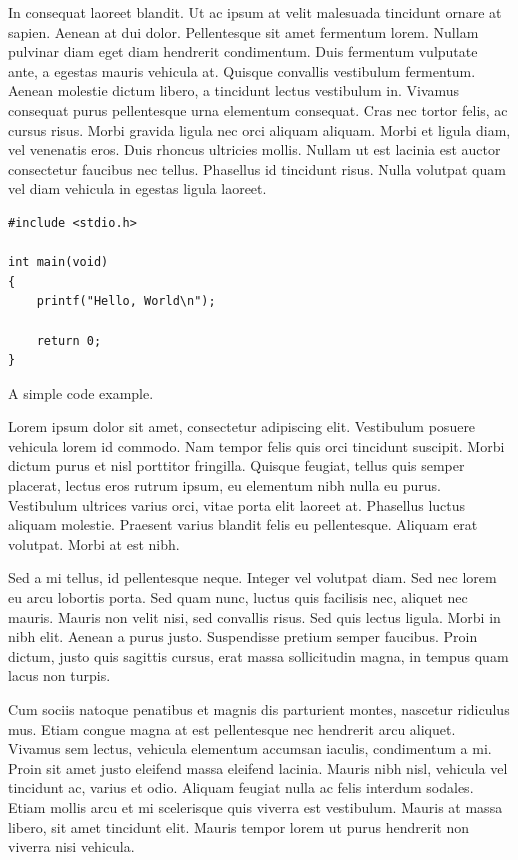 In consequat laoreet blandit. Ut ac ipsum at velit malesuada tincidunt ornare at sapien. Aenean at dui dolor. Pellentesque sit amet fermentum lorem. Nullam pulvinar diam eget diam hendrerit condimentum. Duis fermentum vulputate ante, a egestas mauris vehicula at. Quisque convallis vestibulum fermentum. Aenean molestie dictum libero, a tincidunt lectus vestibulum in. Vivamus consequat purus pellentesque urna elementum consequat. Cras nec tortor felis, ac cursus risus. Morbi gravida ligula nec orci aliquam aliquam. Morbi et ligula diam, vel venenatis eros. Duis rhoncus ultricies mollis. Nullam ut est lacinia est auctor consectetur faucibus nec tellus. Phasellus id tincidunt risus. Nulla volutpat quam vel diam vehicula in egestas ligula laoreet. 

\begin{listing}[t]
\begin{lstlisting}
#include <stdio.h>

int main(void)
{
	printf("Hello, World\n");

	return 0;
}
\end{lstlisting}
\caption{A simple code example.}
\label{lst:example}
\end{listing}

Lorem ipsum dolor sit amet, consectetur adipiscing elit. Vestibulum posuere vehicula lorem id commodo. Nam tempor felis quis orci tincidunt suscipit. Morbi dictum purus et nisl porttitor fringilla. Quisque feugiat, tellus quis semper placerat, lectus eros rutrum ipsum, eu elementum nibh nulla eu purus. Vestibulum ultrices varius orci, vitae porta elit laoreet at. Phasellus luctus aliquam molestie. Praesent varius blandit felis eu pellentesque. Aliquam erat volutpat. Morbi at est nibh.

Sed a mi tellus, id pellentesque neque. Integer vel volutpat diam. Sed nec lorem eu arcu lobortis porta. Sed quam nunc, luctus quis facilisis nec, aliquet nec mauris. Mauris non velit nisi, sed convallis risus. Sed quis lectus ligula. Morbi in nibh elit. Aenean a purus justo. Suspendisse pretium semper faucibus. Proin dictum, justo quis sagittis cursus, erat massa sollicitudin magna, in tempus quam lacus non turpis.

Cum sociis natoque penatibus et magnis dis parturient montes, nascetur ridiculus mus. Etiam congue magna at est pellentesque nec hendrerit arcu aliquet. Vivamus sem lectus, vehicula elementum accumsan iaculis, condimentum a mi. Proin sit amet justo eleifend massa eleifend lacinia. Mauris nibh nisl, vehicula vel tincidunt ac, varius et odio. Aliquam feugiat nulla ac felis interdum sodales. Etiam mollis arcu et mi scelerisque quis viverra est vestibulum. Mauris at massa libero, sit amet tincidunt elit. Mauris tempor lorem ut purus hendrerit non viverra nisi vehicula.

